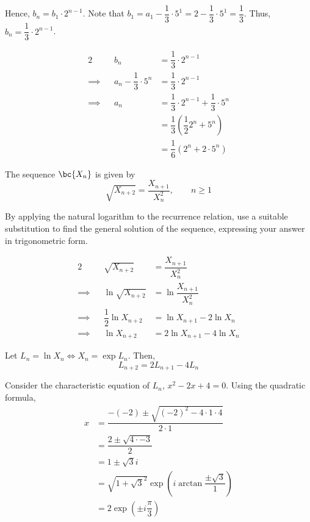 \documentclass{echw}
\begin{document}
            Hence, $b_n = b_1 \cdot 2^{n-1}$. Note that $b_1 = a_1 - \dfrac13 \cdot 5^1 = 2 - \dfrac13 \cdot 5^1 = \dfrac13$. Thus, $b_n = \dfrac13 \cdot 2^{n-1}$.

            \begin{alignat*}{2}
                &&b_n &= \dfrac13 \cdot 2^{n-1}\\
                \implies&&a_n - \dfrac13 \cdot 5^n &= \dfrac13 \cdot 2^{n-1}\\
                \implies&&a_n &= \dfrac13 \cdot 2^{n-1} + \dfrac13 \cdot 5^n\\
                && &= \dfrac13 \left(\dfrac12 2^n + 5^n \right)\\
                && &= \dfrac16 \left(2^n + 2 \cdot 5^n \right)
            \end{alignat*}


    \problem{}
        The sequence $\bc{X_n}$ is given by
        \[
            \sqrt{X_{n+2}} = \dfrac{X_{n+1}}{X_n^2}, \qquad n \geq 1
        \]

         By applying the natural logarithm to the recurrence relation, use a suitable substitution to find the general solution of the sequence, expressing your answer in trigonometric form.

    \solution
        \begin{alignat*}{2}
            &&\sqrt{X_{n+2}} &= \dfrac{X_{n+1}}{X_n^2}\\
            \implies&&\ln \sqrt{X_{n+2}} &= \ln \dfrac{X_{n+1}}{X_n^2}\\
            \implies&&\dfrac12 \ln X_{n+2} &= \ln X_{n+1} - 2 \ln X_n\\
            \implies&&\ln X_{n+2} &= 2\ln X_{n+1} - 4\ln X_n
        \end{alignat*}

        Let $L_n = \ln X_n \iff X_n = \exp{L_n}$. Then,
        \[
            L_{n+2} = 2L_{n+1} - 4L_n
        \]

        Consider the characteristic equation of $L_n$, $x^2 - 2x + 4 = 0$. Using the quadratic formula,
        \begin{align*}
            x &= \dfrac{-(-2) \pm \sqrt{(-2)^2 - 4\cdot1\cdot4}}{2\cdot1}\\
            &= \dfrac{2 \pm \sqrt{4 \cdot -3}}{2}\\
            &= 1 \pm \sqrt{3}i\\
            &= \sqrt{1 + \sqrt{3}^2} \exp{\left(i \arctan{\dfrac{\pm{\sqrt3}}1}\right)}\\
            &= 2 \exp \left(\pm i \dfrac{\pi}3\right)
        \end{align*}
\end{document}
